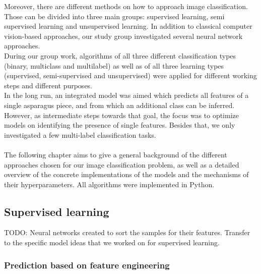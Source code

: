 Moreover, there are different methods on how to approach image classification. Those can be divided into three main groups: supervised learning, semi supervised learning and unsupervised learning. In addition to classical computer vision-based approaches, our study group investigated several neural network approaches. \\

During our group work, algorithms of all three different classification types (binary, multiclass and multilabel) as well as of all three learning types (supervised, semi-supervised and unsupervised) were applied for different working steps and different purposes. \\

In the long run, an integrated model was aimed which predicts all features of a single asparagus piece, and from which an additional class can be inferred. However, as intermediate steps towards that goal, the focus was to optimize models on identifying the presence of single features. Besides that, we only investigated a few multi-label classification tasks.  \\
\\
The following chapter aims to give a general background of the different approaches chosen for our image classification problem, as well as a detailed overview of the concrete implementations of the models and the mechanisms of their hyperparameters. 
All algorithms were implemented in Python.  


\subsection{Supervised learning}

TODO: Neural networks created to sort the samples for their features.
Transfer to the specific model ideas that we worked on for supervised learning.

\subsubsection{Prediction based on feature engineering}

